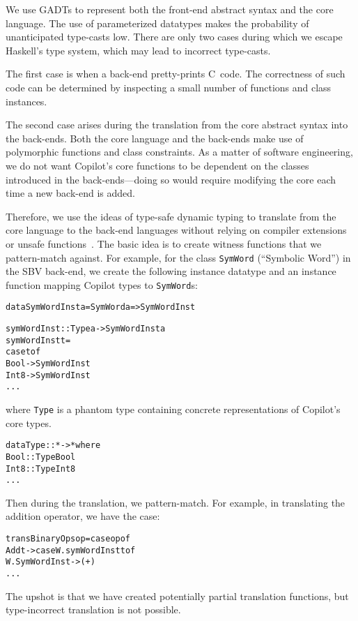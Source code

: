 \documentclass[preprint]{sigplanconf}
\newenvironment{code}{\begin{alltt}\footnotesize}{\end{alltt}}
\begin{document}
We use GADTs to represent both the front-end abstract syntax and the core
language.  The use of parameterized datatypes makes the probability of
unanticipated type-casts low.  There are only two cases during which we escape
Haskell's type system, which may lead to incorrect type-casts.  

The first case is when a back-end pretty-prints C~code.  The correctness of such
code can be determined by inspecting a small number of functions and class
instances.


The second case arises during the translation from the core abstract syntax into
the back-ends.  Both the core language and the back-ends make use of polymorphic
functions and class constraints.  As a matter of software engineering, we do not
want Copilot's core functions to be dependent on the classes introduced in the
back-ends---doing so would require modifying the core each time a new back-end
is added.

Therefore, we use the ideas of type-safe dynamic typing to translate from the
core language to the back-end languages without relying on compiler extensions
or unsafe functions~\cite{typing}.  The basic idea is to
create witness functions that we pattern-match against.  For example, for the
class {\tt SymWord} (``Symbolic Word'') in the SBV back-end, we create the following
instance datatype and an instance function mapping Copilot types to {\tt SymWord}s:
%
\begin{code}
data SymWordInst a = SymWord a => SymWordInst

symWordInst :: Type a -> SymWordInst a
symWordInst t =
  case t of
    Bool   -> SymWordInst
    Int8   -> SymWordInst
    ...
\end{code}
%
where {\tt Type} is a phantom type containing concrete representations of
Copilot's core types.
%
\begin{code}
data Type :: * -> * where
  Bool    :: Type Bool
  Int8    :: Type Int8
  ...  
\end{code}
%
Then during the translation, we pattern-match.  For example, in translating the
addition operator, we have the case:
%
\begin{code}
transBinaryOps op = case op of
  Add t -> case W.symWordInst t of 
             W.SymWordInst ->  (+)
  ...
\end{code}
%
The upshot is that we have created potentially partial translation functions,
but type-incorrect translation is not possible.
\end{document}

